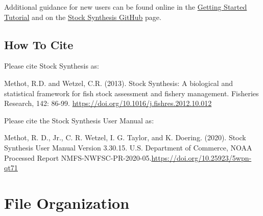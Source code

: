 Additional guidance for new users can be found online in the \href{https://nmfs-stock-synthesis.github.io/doc/Getting_Started_SS.html}{Getting Started Tutorial} and on the \href{https://github.com/nmfs-stock-synthesis/stock-synthesis#how-can-i-learn-how-to-use-stock-synthesis}{Stock Synthesis GitHub} page. 

\hypertarget{cite}{}
\subsection[How to Cite]{How To Cite \protect\hyperlink{cite}{\faExternalLink}}
  
Please cite Stock Synthesis as:

Methot, R.D. and Wetzel, C.R. (2013). Stock Synthesis: A biological and statistical
framework for fish stock assessment and fishery management. Fisheries Research, 
142: 86-99. \href{https://doi.org/10.1016/j.fishres.2012.10.012}{https://doi.org/10.1016/j.fishres.2012.10.012}

Please cite the Stock Synthesis User Manual as:

Methot, R. D., Jr., C. R. Wetzel, I. G. Taylor, and K. Doering. (2020). Stock Synthesis User Manual Version 3.30.15. U.S. Department of Commerce, NOAA Processed Report NMFS-NWFSC-PR-2020-05.\href{https://doi.org/10.25923/5wpn-qt71}{https://doi.org/10.25923/5wpn-qt71}

\pagebreak
		
\section[File Organization]{File Organization \protect\hyperref[sec:FileOrganization]{\faExternalLink}}\label{sec:FileOrganization}
	\hypertarget{input-files}{}
